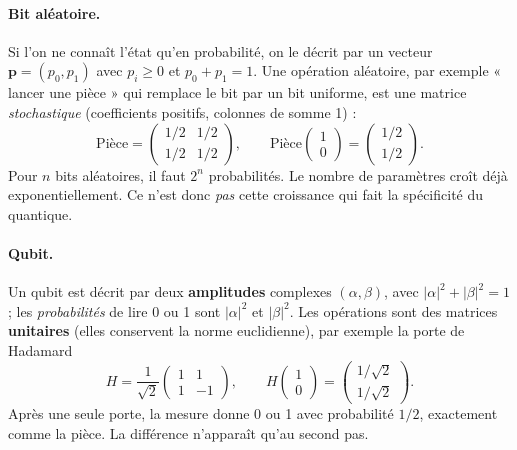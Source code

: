 \paragraph{Bit aléatoire.} Si l'on ne connaît l'état qu'en probabilité, on le décrit par un vecteur $\mathbf p=(p_0,p_1)$ avec $p_i\ge0$ et $p_0+p_1=1$. Une opération aléatoire, par exemple « lancer une pièce » qui remplace le bit par un bit uniforme, est une matrice \emph{stochastique} (coefficients positifs, colonnes de somme 1) :
\[
\text{Pièce}=\begin{pmatrix}1/2&1/2\\1/2&1/2\end{pmatrix},\qquad \text{Pièce}\begin{pmatrix}1\\0\end{pmatrix}=\begin{pmatrix}1/2\\1/2\end{pmatrix}.
\]
Pour $n$ bits aléatoires, il faut $2^n$ probabilités. Le nombre de paramètres croît déjà exponentiellement. Ce n'est donc \emph{pas} cette croissance qui fait la spécificité du quantique.

\paragraph{Qubit.} Un qubit est décrit par deux \textbf{amplitudes} complexes $(\alpha,\beta)$, avec $|\alpha|^2+|\beta|^2=1$ ; les \emph{probabilités} de lire 0 ou 1 sont $|\alpha|^2$ et $|\beta|^2$. Les opérations sont des matrices \textbf{unitaires} (elles conservent la norme euclidienne), par exemple la porte de Hadamard
\[
H=\frac{1}{\sqrt2}\begin{pmatrix}1&1\\1&-1\end{pmatrix},\qquad H\begin{pmatrix}1\\0\end{pmatrix}=\begin{pmatrix}1/\sqrt2\\1/\sqrt2\end{pmatrix}.
\]
Après une seule porte, la mesure donne 0 ou 1 avec probabilité $1/2$, exactement comme la pièce. La différence n'apparaît qu'au second pas.

